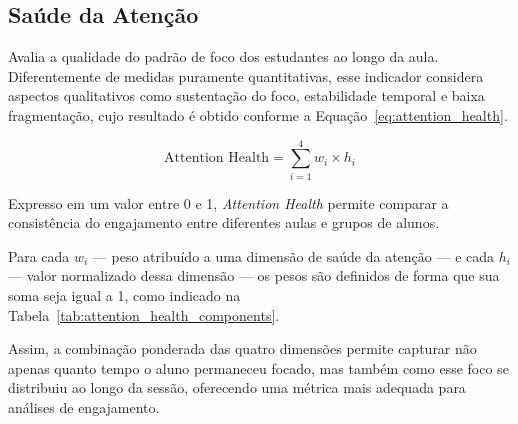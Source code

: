 \subsection{Saúde da Atenção}

Avalia a qualidade do padrão de foco dos estudantes ao longo da aula. Diferentemente de medidas puramente quantitativas, esse indicador considera aspectos qualitativos como sustentação do foco, estabilidade temporal e baixa fragmentação, cujo resultado é obtido conforme a Equação~\ref{eq:attention_health}.

\begin{equation}\label{eq:attention_health}
\text{Attention Health} = \sum_{i=1}^{4} w_i \times h_i
\end{equation}

Expresso em um valor entre 0 e 1, \textit{Attention Health} permite comparar a consistência do engajamento entre diferentes aulas e grupos de alunos.

Para cada $w_i$ — peso atribuído a uma dimensão de saúde da atenção — e cada $h_i$ — valor normalizado dessa dimensão — os pesos são definidos de forma que sua soma seja igual a 1, como indicado na Tabela~\ref{tab:attention_health_components}.



Assim, a combinação ponderada das quatro dimensões permite capturar não apenas quanto tempo o aluno permaneceu focado, mas também como esse foco se distribuiu ao longo da sessão, oferecendo uma métrica mais adequada para análises de engajamento.

% 



